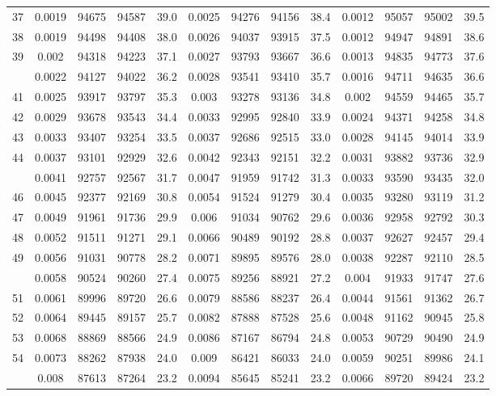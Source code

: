 \documentclass[
  14pt,
]{article}
\begin{document}
\begin{longtable}[t]{lcccccccccccc}
37 & 0.0019 & 94675 & 94587 & 39.0 & 0.0025 & 94276 & 94156 & 38.4 & 0.0012 & 95057 & 95002 & 39.5\\
38 & 0.0019 & 94498 & 94408 & 38.0 & 0.0026 & 94037 & 93915 & 37.5 & 0.0012 & 94947 & 94891 & 38.6\\
39 & 0.002 & 94318 & 94223 & 37.1 & 0.0027 & 93793 & 93667 & 36.6 & 0.0013 & 94835 & 94773 & 37.6\\
\addlinespace
40 & 0.0022 & 94127 & 94022 & 36.2 & 0.0028 & 93541 & 93410 & 35.7 & 0.0016 & 94711 & 94635 & 36.6\\
41 & 0.0025 & 93917 & 93797 & 35.3 & 0.003 & 93278 & 93136 & 34.8 & 0.002 & 94559 & 94465 & 35.7\\
42 & 0.0029 & 93678 & 93543 & 34.4 & 0.0033 & 92995 & 92840 & 33.9 & 0.0024 & 94371 & 94258 & 34.8\\
43 & 0.0033 & 93407 & 93254 & 33.5 & 0.0037 & 92686 & 92515 & 33.0 & 0.0028 & 94145 & 94014 & 33.9\\
44 & 0.0037 & 93101 & 92929 & 32.6 & 0.0042 & 92343 & 92151 & 32.2 & 0.0031 & 93882 & 93736 & 32.9\\
\addlinespace
45 & 0.0041 & 92757 & 92567 & 31.7 & 0.0047 & 91959 & 91742 & 31.3 & 0.0033 & 93590 & 93435 & 32.0\\
46 & 0.0045 & 92377 & 92169 & 30.8 & 0.0054 & 91524 & 91279 & 30.4 & 0.0035 & 93280 & 93119 & 31.2\\
47 & 0.0049 & 91961 & 91736 & 29.9 & 0.006 & 91034 & 90762 & 29.6 & 0.0036 & 92958 & 92792 & 30.3\\
48 & 0.0052 & 91511 & 91271 & 29.1 & 0.0066 & 90489 & 90192 & 28.8 & 0.0037 & 92627 & 92457 & 29.4\\
49 & 0.0056 & 91031 & 90778 & 28.2 & 0.0071 & 89895 & 89576 & 28.0 & 0.0038 & 92287 & 92110 & 28.5\\
\addlinespace
50 & 0.0058 & 90524 & 90260 & 27.4 & 0.0075 & 89256 & 88921 & 27.2 & 0.004 & 91933 & 91747 & 27.6\\
51 & 0.0061 & 89996 & 89720 & 26.6 & 0.0079 & 88586 & 88237 & 26.4 & 0.0044 & 91561 & 91362 & 26.7\\
52 & 0.0064 & 89445 & 89157 & 25.7 & 0.0082 & 87888 & 87528 & 25.6 & 0.0048 & 91162 & 90945 & 25.8\\
53 & 0.0068 & 88869 & 88566 & 24.9 & 0.0086 & 87167 & 86794 & 24.8 & 0.0053 & 90729 & 90490 & 24.9\\
54 & 0.0073 & 88262 & 87938 & 24.0 & 0.009 & 86421 & 86033 & 24.0 & 0.0059 & 90251 & 89986 & 24.1\\
\addlinespace
55 & 0.008 & 87613 & 87264 & 23.2 & 0.0094 & 85645 & 85241 & 23.2 & 0.0066 & 89720 & 89424 & 23.2\\

\end{longtable}
\end{document}
